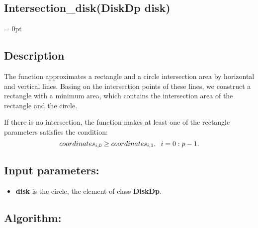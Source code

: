 \documentclass{report}
\begin{document}
	\label{Intersection}	
	\begin{center} 
		\section*{Intersection\_disk(DiskDp disk)}
	\end{center}

	\parindent = 0pt
	\subsection*{Description}

	The function approximates a rectangle and a circle intersection area by horizontal and vertical lines. Basing on the intersection points of these lines, we construct a rectangle with a minimum area, which contains the intersection area of the rectangle and the circle.

	If there is no intersection, the function makes at least one of the rectangle parameters satisfies the condition: 
	\begin{equation}
		coordinates_{i,0} \ge coordinates_{i,1} , \hspace*{2mm} i = 0:p-1.
		\label{eq:cond1}
	\end{equation}

	\subsection*{Input parameters:}
	\begin{itemize}
		\item {\bfseries disk}  is the circle, the element of class {\bfseries DiskDp}.
	\end{itemize}

	\subsection*{Algorithm:}
\end{document}
